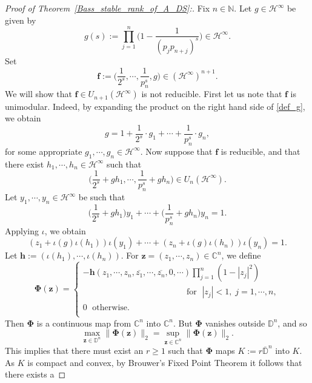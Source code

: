 \documentclass[11pt,reqno]{amsart}
\numberwithin{equation}{section}
\theoremstyle{definition}
\theoremstyle{definition}
\theoremstyle{definition}
\begin{document}
\begin{proof}[Proof of Theorem~\ref{Bass_stable_rank_of_A_DS}:] 
Fix $n\in {\mathbb{N}}$. Let $g\in {{{\mathscr{H}}^{\infty}}}$ be given by 
\begin{equation}
\label{def_g}
 g(s):= \prod_{j=1}^n \Big(1-\frac{1}{(p_j p_{n+j})^s} \Big) \in {{{\mathscr{H}}^{\infty}}}.
\end{equation}
Set 
$$
\mathbf{f}:=\Big(\frac{1}{2^s},\cdots,\frac{1}{p_n^s}, g\Big) \in ({{{\mathscr{H}}^{\infty}}})^{n+1}.
$$
We will show that $\mathbf{f}\in U_{n+1} ({{{\mathscr{H}}^{\infty}}})$ is not
reducible. First let us note that $\mathbf{f}$ is unimodular. Indeed,
by expanding the product on the right hand side of \eqref{def_g}, we
obtain
$$
g=1+\frac{1}{2^s}\cdot  g_1+\cdots +\frac{1}{p_n^s}\cdot g_n,
$$
for some appropriate $g_1,\cdots, g_n\in {{{\mathscr{H}}^{\infty}}}$. Now suppose that
$\mathbf{f}$ is reducible, and that there exist $h_1,\cdots,h_n\in
{{{\mathscr{H}}^{\infty}}}$ such that
$$
\Big(\frac{1}{2^s}+gh_1,\cdots,\frac{1}{p_n^s}+gh_n\Big)\in U_n({{{\mathscr{H}}^{\infty}}}).
$$
Let $y_1,\cdots , y_n\in {{{\mathscr{H}}^{\infty}}}$ be such that 
$$
\Big( \frac{1}{2^s}+gh_1\Big)y_1+\cdots+\Big(\frac{1}{p_n^s}+gh_n\Big)y_n=1.
$$
Applying $\iota$, we obtain
\begin{equation}
\label{eq_Bsr_1}
(z_1+\iota(g) \iota(h_1))\iota(y_1)+\cdots+ (z_n+\iota(g) \iota(h_n))\iota(y_n)=1 .
\end{equation}
Let $\mathbf{h}:=(\iota(h_1),\cdots, \iota(h_n))$. For
$\mathbf{z}=(z_1,\cdots, z_n)\in {\mathbb{C}}^n$, we define
$$
\mathbf{\Phi}(\mathbf{z})=\left\{ \begin{array}{l} 
 -\mathbf{h}(z_1,\cdots, z_n,\overline{z_1},\cdots, \overline{z_n},0,\cdots) 
\displaystyle\prod_{j=1}^n (1-|z_j|^2)  
\\
\phantom{h(z_1,\cdots, z_n,\overline{z_1},\cdots, \overline{z_n},0,\cdots)}
\textrm{ for }\; |z_j|< 1, \;j=1,\cdots,n,\\
0 \; \textrm{ otherwise}.\phantom{\displaystyle\prod_{j=1}^n}
\end{array}\right.
$$
Then $\mathbf{\Phi}$ is a continuous map from ${\mathbb{C}}^n$ into ${\mathbb{C}}^n$.
But $\mathbf{\Phi}$ vanishes outside $ {\mathbb{D}}^n$, and so
$$
 \max_{\mathbf{z}\in {\mathbb{D}}^n }\|\mathbf{\Phi}(\mathbf{z})\|_2
= \sup_{\mathbf{z}\in {\mathbb{C}}^n} \|\mathbf{\Phi}(\mathbf{z})\|_2.
$$
This implies that there must exist an $r\geq 1$ such that $\mathbf{\Phi}$
maps $K:=r \overline{\mathbb{D}}^n$ into $K$. As $K$ is compact and convex,
by Brouwer's Fixed Point Theorem it follows that there exists a

\end{proof}
\end{document}
